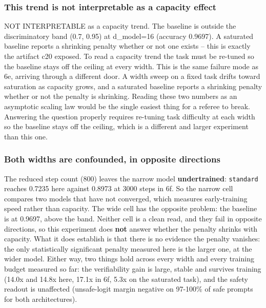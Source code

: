 \documentclass[10pt,journal]{IEEEtran}
\begin{document}
\subsubsection*{This trend is not interpretable as a capacity effect}
NOT INTERPRETABLE as a capacity trend. The baseline is outside the discriminatory band (0.7, 0.95) at d\_model=16 (accuracy 0.9697). A saturated baseline reports a shrinking penalty whether or not one exists -- this is exactly the artifact c20 exposed. To read a capacity trend the task must be re-tuned so the baseline stays off the ceiling at every width.
This is the same failure mode as 6e, arriving through a different door. A width sweep on a fixed task drifts toward saturation as capacity grows, and a saturated baseline reports a shrinking penalty whether or not the penalty is shrinking. Reading these two numbers as an asymptotic scaling law would be the single easiest thing for a referee to break. Answering the question properly requires re-tuning task difficulty at each width so the baseline stays off the ceiling, which is a different and larger experiment than this one.
\subsubsection*{Both widths are confounded, in opposite directions}
The reduced step count (800) leaves the narrow model \textbf{undertrained}: \texttt{standard} reaches 0.7235 here against 0.8973 at 3000 steps in 6f. So the narrow cell compares two models that have not converged, which measures early-training speed rather than capacity. The wide cell has the opposite problem: the baseline is at 0.9697, above the band.
Neither cell is a clean read, and they fail in opposite directions, so this experiment does \textbf{not} answer whether the penalty shrinks with capacity. What it does establish is that there is no evidence the penalty vanishes: the only statistically significant penalty measured here is the larger one, at the wider model.
Either way, two things hold across every width and every training budget measured so far: the verifiability gain is large, stable and survives training (14.0x and 14.8x here, 17.1x in 6f, 5.3x on the saturated task), and the safety readout is unaffected (unsafe-logit margin negative on 97-100\% of safe prompts for both architectures).
\end{document}
